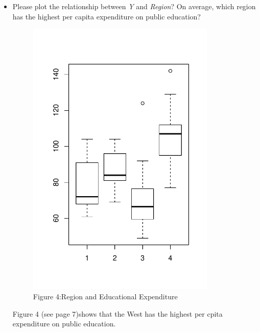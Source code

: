\documentclass[12pt,letterpaper]{article}
\begin{document}
\begin{itemize}
		\item
		Please plot the relationship between \emph{Y} and \emph{Region}? On average, which region has the highest per capita expenditure on public education?
		\vspace{.5cm}
			  
		\vspace{.5cm}
	    \begin{figure}\centering
		\caption{Figure 4:Region and Educational Expenditure}
		\includegraphics[width=0.85\textwidth]{Rplot4.pdf}
	 \end{figure}	
		Figure 4 (see page 7)shows that the West has the highest per cpita expenditure on public education.
		

\end{itemize}
\end{document}
